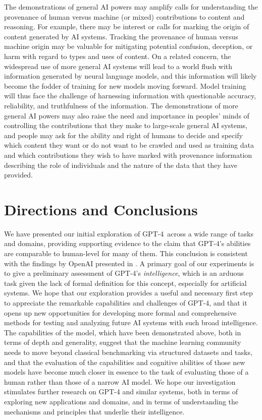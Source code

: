 The demonstrations of general AI powers may amplify calls for understanding the provenance of human versus machine (or mixed) contributions to content and reasoning.  For example, there may be interest or calls for marking the origin of content generated by AI systems. Tracking the provenance of human versus machine origin may be valuable for mitigating potential confusion, deception, or harm with regard to types and uses of content. On a related concern, the widespread use of more general AI systems will lead to a world flush with information generated by neural language models, and this information will likely become the fodder of training for new models moving forward. Model training will thus face the challenge of harnessing information with questionable accuracy, reliability, and truthfulness of the information. The demonstrations of more general AI powers may also raise the need and importance in peoples’ minds of controlling the contributions that they make to large-scale general AI systems, and people may ask for the ability and right of humans to decide and specify which content they want or do not want to be crawled and used as training data and which contributions they wish to have marked with provenance information describing the role of individuals and the nature of the data that they have provided. 

\section{Directions and Conclusions}
\label{sec:conclusions}

We have presented our initial exploration of GPT-4\ across a wide range of tasks and domains, providing supporting evidence to the claim that GPT-4's abilities are comparable to human-level for many of them. This conclusion is consistent with the findings by OpenAI presented in \cite{gpt4}. A primary goal of our experiments is to give a preliminary assessment of GPT-4's {\em intelligence}, which is an arduous task given the lack of formal definition for this concept, especially for artificial systems. We hope that our exploration provides a useful and necessary first step to appreciate the remarkable capabilities and challenges of {GPT-4}, and that it opens up new opportunities for developing more formal and comprehensive methods for testing and analyzing future AI systems with such broad intelligence. The capabilities of the model, which have been demonstrated above, both in terms of depth and generality, suggest that the machine learning community needs to move beyond classical benchmarking via structured datasets and tasks, and that the evaluation of the capabilities and cognitive abilities of those new models have become much closer in essence to the task of evaluating those of a human rather than those of a narrow AI model. We hope our investigation stimulates further research on {GPT-4} and similar systems, both in terms of exploring new applications and domains, and in terms of understanding the mechanisms and principles that underlie their intelligence.

